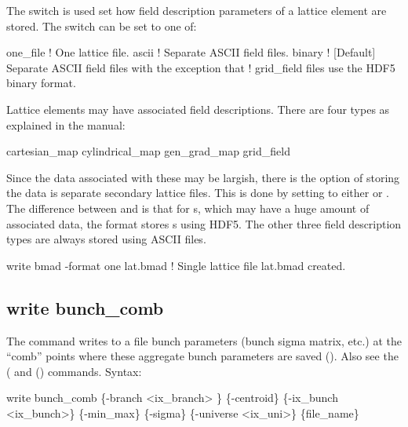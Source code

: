{{{{{{{{{{{The  switch is used set how field description parameters of a lattice element
are stored. The  switch can be set to one of:
\begin{example}
  one_file      ! One lattice file.
  ascii         ! Separate ASCII field files.
  binary        ! [Default] Separate ASCII field files with the exception that
                !   grid_field files use the HDF5 binary format.
\end{example}
Lattice elements may have associated field descriptions. There are four types as explained in the
\bmad manual:
\begin{example}
  cartesian_map
  cylindrical_map
  gen_grad_map
  grid_field
\end{example}
Since the data associated with these may be largish, there is the option of storing the data is
separate secondary lattice files. This is done by setting  to either  or
. The difference between  and  is that for s, which
may have a huge amount of associated data, the  format stores s using
HDF5. The other three field description types are always stored using ASCII files.

\begin{example}
  write bmad -format one lat.bmad  ! Single lattice file lat.bmad created.
\end{example}


\subsection{write bunch_comb}
\label{s:write.bunch.comb}

The  command writes to a file bunch parameters (bunch sigma matrix, etc.) at
the ``comb'' points where these aggregate bunch parameters are saved (). Also see
the  ( and  ()
commands. Syntax:
\begin{example}
    write bunch_comb \{-branch <ix_branch> \} \{-centroid\} \{-ix_bunch <ix_bunch>\} 
                        \{-min_max\} \{-sigma\} \{-universe <ix_uni>\} \{file_name\}  
\end{example}

}}}}}}}}}}}
